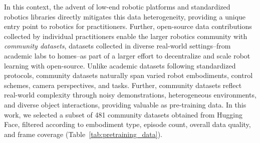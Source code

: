 In this context, the advent of low-end robotic platforms and standardized robotics libraries directly mitigates this data heterogeneity, providing a unique entry point to robotics for practitioners. 
Further, open-source data contributions collected by individual practitioners enable the larger robotics community with \textit{community datasets}, datasets collected in diverse real-world settings--from academic labs to homes--as part of a larger effort to decentralize and scale robot learning with open-source.
Unlike academic datasets following standardized protocols, community datasets naturally span varied robot embodiments, control schemes, camera perspectives, and tasks. Further, community datasets reflect real-world complexity through noisy demonstrations, heterogeneous environments, and diverse object interactions, providing valuable as pre-training data. In this work, we selected a subset of 481 community datasets obtained from Hugging Face, filtered according to embodiment type, episode count, overall data quality, and frame coverage (Table~\ref{tab:pretraining_data}).








